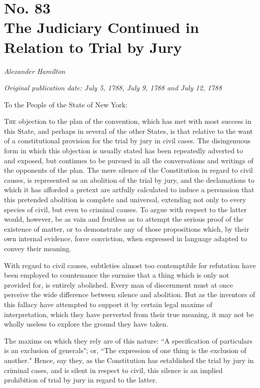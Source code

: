 \chapter[No. 83: The Judiciary Continued in Relation to Trial by Jury]{No. 83\\ {\small The Judiciary Continued in Relation to Trial by Jury}}

\textit{Alexander Hamilton}

\textit{Original publication date: July 5, 1788, July 9, 1788 and July 12, 1788}
\vspace{1cm}

To the People of the State of New York:
\vspace{.4cm}

\textsc{The} objection to the plan of the convention, which has met with most success in this State, and perhaps in several of the other States, is that relative to the want of a constitutional provision for the trial by jury in civil cases. 
The disingenuous form in which this objection is usually stated has been repeatedly adverted to and exposed, but continues to be pursued in all the conversations and writings of the opponents of the plan. 
The mere silence of the Constitution in regard to civil causes, is represented as an abolition of the trial by jury, and the declamations to which it has afforded a pretext are artfully calculated to induce a persuasion that this pretended abolition is complete and universal, extending not only to every species of civil, but even to criminal causes. 
To argue with respect to the latter would, however, be as vain and fruitless as to attempt the serious proof of the existence of matter, or to demonstrate any of those propositions which, by their own internal evidence, force conviction, when expressed in language adapted to convey their meaning.

With regard to civil causes, subtleties almost too contemptible for refutation have been employed to countenance the surmise that a thing which is only not provided for, is entirely abolished. 
Every man of discernment must at once perceive the wide difference between silence and abolition. 
But as the inventors of this fallacy have attempted to support it by certain legal maxims of interpretation, which they have perverted from their true meaning, it may not be wholly useless to explore the ground they have taken.

The maxims on which they rely are of this nature: ``A specification of particulars is an exclusion of generals"; or, ``The expression of one thing is the exclusion of another." Hence, say they, as the Constitution has established the trial by jury in criminal cases, and is silent in respect to civil, this silence is an implied prohibition of trial by jury in regard to the latter.


